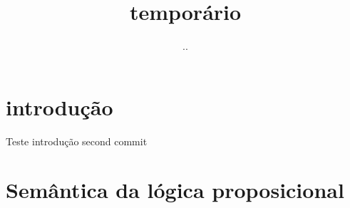 \documentclass{article}
\title{temporário}
\author{..}
\begin{document}
\maketitle

\section{introdução}

Teste introdução
second commit

\section{Semântica da lógica proposicional}
\end{document}
